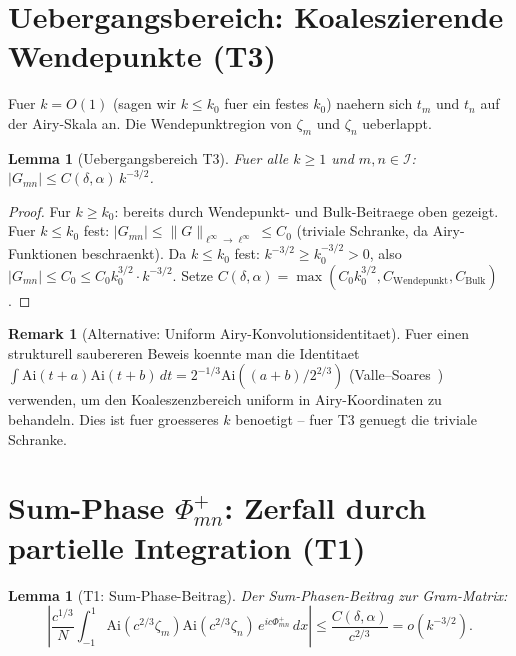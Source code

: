 \documentclass[12pt,a4paper]{amsart}
\newtheorem{lemma}[theorem]{Lemma}
\theoremstyle{definition}
\newtheorem{remark}[theorem]{Remark}
\newcommand{\Ai}{\mathrm{Ai}}
\newcommand{\zn}{\zeta_n}
\newcommand{\zm}{\zeta_m}
\newcommand{\tn}{t_n}
\newcommand{\tm}{t_m}
\newcommand{\Pp}{\Phi^+_{mn}}
\newcommand{\abs}[1]{\left|#1\right|}
\newcommand{\norm}[1]{\|#1\|}
\begin{document}
\section{Uebergangsbereich: Koaleszierende Wendepunkte (T3)}
\label{sec:transition}

Fuer $k = O(1)$ (sagen wir $k \le k_0$ fuer ein festes $k_0$)
naehern sich $\tm$ und $\tn$ auf der Airy-Skala an.
Die Wendepunktregion von $\zm$ und $\zn$ ueberlappt.

\begin{lemma}[Uebergangsbereich T3]\label{lem:transition}
Fuer alle $k \ge 1$ und $m, n \in \mathcal{I}$:
$\abs{G_{mn}} \le C(\delta,\alpha)\,k^{-3/2}$.
\end{lemma}

\begin{proof}
Fur $k \ge k_0$: bereits durch Wendepunkt- und Bulk-Beitraege oben gezeigt.
Fuer $k \le k_0$ fest: $|G_{mn}| \le \norm{G}_{\ell^\infty \to \ell^\infty} \le C_0$
(triviale Schranke, da Airy-Funktionen beschraenkt).
Da $k \le k_0$ fest: $k^{-3/2} \ge k_0^{-3/2} > 0$,
also $|G_{mn}| \le C_0 \le C_0 k_0^{3/2} \cdot k^{-3/2}$.
Setze $C(\delta,\alpha) = \max(C_0 k_0^{3/2}, C_{\mathrm{Wendepunkt}}, C_{\mathrm{Bulk}})$.
\end{proof}

\begin{remark}[Alternative: Uniform Airy-Konvolutionsidentitaet]
Fuer einen strukturell saubereren Beweis koennte man die Identitaet
$\int \Ai(t+a)\Ai(t+b)\,dt = 2^{-1/3}\Ai((a+b)/2^{2/3})$
(Valle--Soares~\cite{Vallee2004}) verwenden, um den Koaleszenzbereich
uniform in Airy-Koordinaten zu behandeln.
Dies ist fuer groesseres $k$ benoetigt -- fuer T3 genuegt die triviale Schranke.
\end{remark}

\section{Sum-Phase $\Pp$: Zerfall durch partielle Integration (T1)}
\label{sec:sumphase}

\begin{lemma}[T1: Sum-Phase-Beitrag]\label{lem:sumphase}
Der Sum-Phasen-Beitrag zur Gram-Matrix:
\begin{equation}\label{eq:sumphase_bound}
  \abs{\frac{c^{1/3}}{N}\int_{-1}^{1}\Ai(c^{2/3}\zm)\Ai(c^{2/3}\zn)\,e^{ic\Pp}\,dx}
  \le \frac{C(\delta,\alpha)}{c^{2/3}} = o(k^{-3/2}).
\end{equation}
\end{lemma}
\end{document}
